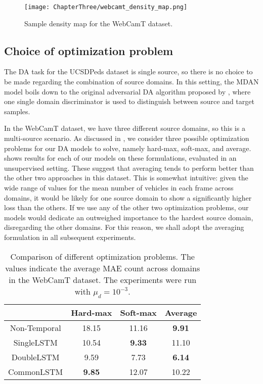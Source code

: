 \begin{figure}[!ht]
	\centering
	\texttt{[image: ChapterThree/webcamt\_density\_map.png]}
	\caption{Sample density map for the WebCamT dataset.}
	\label{fig:webcamt_density_map}
\end{figure}

\subsection{Choice of optimization problem}

The DA task for the UCSDPeds dataset is single source, so there is no choice to be made regarding the combination of source domains. In this setting, the MDAN model boils down to the original adversarial DA algorithm proposed by \citet{Ganin2015}, where one single domain discriminator is used to distinguish between source and target samples.

In the WebCamT dataset, we have three different source domains, so this is a multi-source scenario. As discussed in , we consider three possible optimization problems for our DA models to solve, namely hard-max, soft-max, and average.  shows results for each of our models on these formulations, evaluated in an unsupervised setting. These suggest that averaging tends to perform better than the other two approaches in this dataset. This is somewhat intuitive: given the wide range of values for the mean number of vehicles in each frame across domains, it would be likely for one source domain to show a significantly higher loss than the others. If we use any of the other two optimization problems, our models would dedicate an outweighed importance to the hardest source domain, disregarding the other domains. For this reason, we shall adopt the averaging formulation in all subsequent experiments.

\begin{table}[!ht]
	\centering
	\begin{tabular}{ c | c  c  c }
		 & Hard-max & Soft-max & Average\\
		\hline
		Non-Temporal & 18.15 & 11.16 & \textbf{9.91}  \\
		SingleLSTM & 10.54 & \textbf{9.33} & 11.10  \\
		DoubleLSTM & 9.59 & 7.73 & \textbf{6.14} \\
		CommonLSTM & \textbf{9.85} & 12.07 & 10.22 \\
	\end{tabular}
	\caption{Comparison of different optimization problems. The values indicate the average MAE count across domains in the WebCamT dataset. The experiments were run with $\mu_d=10^{-3}$. }
	\label{table:optimization_experiments}
\end{table}

